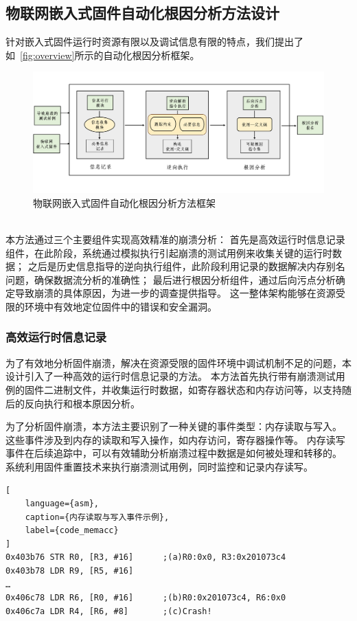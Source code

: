 \subsection{物联网嵌入式固件自动化根因分析方法设计} %
针对嵌入式固件运行时资源有限以及调试信息有限的特点，我们提出了如~\autoref{fig:overview}所示的自动化根因分析框架。
\begin{figure}[h]
    \centering
    \includegraphics[width=1.0\textwidth]{./figure/Overview.png}
    \caption{物联网嵌入式固件自动化根因分析方法框架}
    \label{fig:overview}
\end{figure}\\
本方法通过三个主要组件实现高效精准的崩溃分析：
首先是高效运行时信息记录组件，在此阶段，系统通过模拟执行引起崩溃的测试用例来收集关键的运行时数据；
之后是历史信息指导的逆向执行组件，此阶段利用记录的数据解决内存别名问题，确保数据流分析的准确性；
最后进行根因分析组件，通过后向污点分析确定导致崩溃的具体原因，为进一步的调查提供指导。
这一整体架构能够在资源受限的环境中有效地定位固件中的错误和安全漏洞。

\subsubsection{高效运行时信息记录}
为了有效地分析固件崩溃，解决在资源受限的固件环境中调试机制不足的问题，本设计引入了一种高效的运行时信息记录的方法。
本方法首先执行带有崩溃测试用例的固件二进制文件，并收集运行时数据，如寄存器状态和内存访问等，以支持随后的反向执行和根本原因分析。

为了分析固件崩溃，本方法主要识别了一种关键的事件类型：内存读取与写入。
这些事件涉及到内存的读取和写入操作，如内存访问，寄存器操作等。
内存读写事件在后续追踪中，可以有效辅助分析崩溃过程中数据是如何被处理和转移的。
系统利用固件重置技术来执行崩溃测试用例，同时监控和记录内存读写。
\begin{lstlisting}[
    language={asm},
    caption={内存读取与写入事件示例},
    label={code_memacc}
]
0x403b76 STR R0, [R3, #16]      ;(a)R0:0x0, R3:0x201073c4
0x403b78 LDR R9, [R5, #16]
…
0x406c78 LDR R6, [R0, #16]      ;(b)R0:0x201073c4, R6:0x0
0x406c7a LDR R4, [R6, #8]       ;(c)Crash!
\end{lstlisting}

